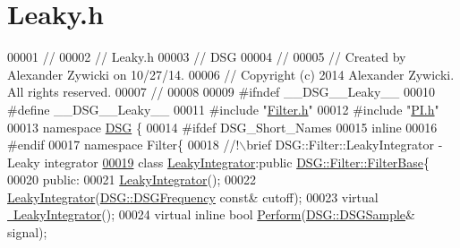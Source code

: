 \hypertarget{_leaky_8h_source}{\section{Leaky.\+h}
\label{_leaky_8h_source}
}

\begin{DoxyCode}
00001 \textcolor{comment}{//}
00002 \textcolor{comment}{//  Leaky.h}
00003 \textcolor{comment}{//  DSG}
00004 \textcolor{comment}{//}
00005 \textcolor{comment}{//  Created by Alexander Zywicki on 10/27/14.}
00006 \textcolor{comment}{//  Copyright (c) 2014 Alexander Zywicki. All rights reserved.}
00007 \textcolor{comment}{//}
00008 
00009 \textcolor{preprocessor}{#ifndef \_\_DSG\_\_Leaky\_\_}
00010 \textcolor{preprocessor}{#define \_\_DSG\_\_Leaky\_\_}
00011 \textcolor{preprocessor}{#include "\hyperlink{_filter_8h}{Filter.h}"}
00012 \textcolor{preprocessor}{#include "\hyperlink{_p_i_8h}{PI.h}"}
00013 \textcolor{keyword}{namespace }\hyperlink{namespace_d_s_g}{DSG} \{
00014 \textcolor{preprocessor}{#ifdef DSG\_Short\_Names}
00015     \textcolor{keyword}{inline}
00016 \textcolor{preprocessor}{#endif}
00017     \textcolor{keyword}{namespace }Filter\{\textcolor{comment}{}
00018 \textcolor{comment}{        //!\(\backslash\)brief DSG::Filter::LeakyIntegrator - Leaky integrator }
\hypertarget{_leaky_8h_source_l00019}{}\hyperlink{class_d_s_g_1_1_filter_1_1_leaky_integrator}{00019} \textcolor{comment}{}        \textcolor{keyword}{class }\hyperlink{class_d_s_g_1_1_filter_1_1_leaky_integrator}{LeakyIntegrator}:\textcolor{keyword}{public} \hyperlink{class_d_s_g_1_1_filter_1_1_filter_base}{DSG::Filter::FilterBase}\{
00020         \textcolor{keyword}{public}:
00021             \hyperlink{class_d_s_g_1_1_filter_1_1_leaky_integrator_af0d204e3c2f5f844dc4355810f6515c2}{LeakyIntegrator}();
00022             \hyperlink{class_d_s_g_1_1_filter_1_1_leaky_integrator_af0d204e3c2f5f844dc4355810f6515c2}{LeakyIntegrator}(\hyperlink{namespace_d_s_g_a4315a061386fa1014fda09b15d3a6973}{DSG::DSGFrequency} \textcolor{keyword}{const}& cutoff);
00023             \textcolor{keyword}{virtual} \hyperlink{class_d_s_g_1_1_filter_1_1_leaky_integrator_a3a79cdbcf90a7924c05ec87b89fca83d}{~LeakyIntegrator}();
00024             \textcolor{keyword}{virtual} \textcolor{keyword}{inline} \textcolor{keywordtype}{bool} \hyperlink{class_d_s_g_1_1_filter_1_1_leaky_integrator_a14ffd2f68de0cb9941d3295307ef13f0}{Perform}(\hyperlink{namespace_d_s_g_ac39a94cd27ebcd9c1e7502d0c624894a}{DSG::DSGSample}& signal);

\end{DoxyCode}
